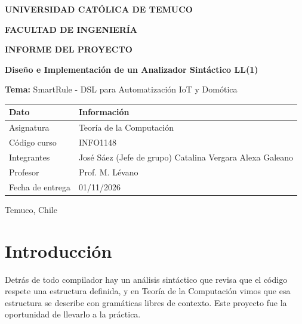 \documentclass[12pt,a4paper]{article}
\begin{document}
\begin{titlepage}
    \centering
    \vspace*{-1cm}
    {\Large \textbf{UNIVERSIDAD CATÓLICA DE TEMUCO}\par}
    {\large \textbf{FACULTAD DE INGENIERÍA}\par}
    \vspace{1.5cm}
    
    {\LARGE \textbf{INFORME DEL PROYECTO}\par}
    \vspace{0.5cm}
    {\Large \textbf{Diseño e Implementación de un Analizador Sintáctico LL(1)}\par}
    \vspace{1cm}
    
    {\Large \textbf{Tema:} SmartRule - DSL para Automatización IoT y Domótica\par}
    \vspace{2cm}
    
    \begin{center}
    \begin{tabular}{|p{4.5cm}|p{9cm}|}
    \hline
    \textbf{Dato} & \textbf{Información} \\ 
    \hline
    Asignatura & Teoría de la Computación \\ 
    \hline
    Código curso & INFO1148 \\ 
    \hline
    Integrantes & José Sáez (Jefe de grupo) \newline Catalina Vergara \newline Alexa Galeano \\ 
    \hline
    Profesor & Prof. M. Lévano \\ 
    \hline
    Fecha de entrega & 01/11/2026 \\ 
    \hline
    \end{tabular}
    \end{center}
    
    \vfill
    
    {\large Temuco, Chile\par}
\end{titlepage}

\newpage
\tableofcontents
\newpage
\listoftables
\newpage
\listoffigures
\newpage

\section{Introducción}
Detrás de todo compilador hay un análisis sintáctico que revisa que el código respete una estructura definida, y en Teoría de la Computación vimos que esa estructura se describe con gramáticas libres de contexto. Este proyecto fue la oportunidad de llevarlo a la práctica.
\end{document}
